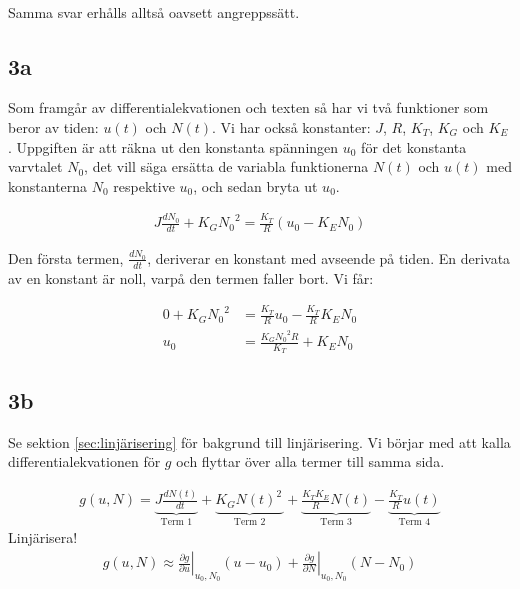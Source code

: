 \documentclass[a4paper]{article}
\begin{document}
\\


Samma svar erhålls alltså oavsett angreppssätt.




\subsection{3a}
Som framgår av differentialekvationen och texten så har vi två funktioner som beror av tiden: $u(t)$ och $N(t)$. Vi har också konstanter: $J$, $R$, $K_T$, $K_G$ och $K_E$. Uppgiften är att räkna ut den konstanta spänningen $u_0$ för det konstanta varvtalet $N_0$, det vill säga ersätta de variabla funktionerna $N(t)$ och $u(t)$ med konstanterna $N_0$ respektive $u_0$, och sedan bryta ut $u_0$.

\begin{align*}
  J \frac{dN_0}{dt} + K_G{N_0}^2 = \frac{K_T}{R}(u_0 - K_EN_0)
\end{align*}

Den första termen, $\frac{dN_0}{dt}$, deriverar en konstant med avseende på tiden. En derivata av en konstant är noll, varpå den termen faller bort. Vi får:

\begin{align*}
  0 + K_G{N_0}^2 &= \frac{K_T}{R}u_0 - \frac{K_T}{R}K_EN_0\\
  u_0 &= \frac{K_G{N_0}^2R}{K_T} + K_EN_0
\end{align*}



\subsection{3b}
Se sektion \ref{sec:linjärisering} för bakgrund till linjärisering. Vi börjar med att kalla differentialekvationen för $g$ och flyttar över alla termer till samma sida.

\begin{align*}
  g(u, N) = \underbrace{J \frac{dN(t)}{dt}}_{\text{Term 1}} + \underbrace{K_G{N(t)}^2\frac{ }{ }}_{\text{Term 2}} + \underbrace{\frac{K_T K_E}{R} N(t)}_{\text{Term 3}} - \underbrace{\frac{K_T}{R}u(t)}_{\text{Term 4}}
\end{align*}
Linjärisera!
\begin{align*}
  g(u, N) \approx \left. \frac{\partial g}{\partial u}\right|_{u_0, N_0}(u - u_0) + \left. \frac{\partial g}{\partial N}\right|_{u_0, N_0}(N - N_0)
\end{align*}
\end{document}
